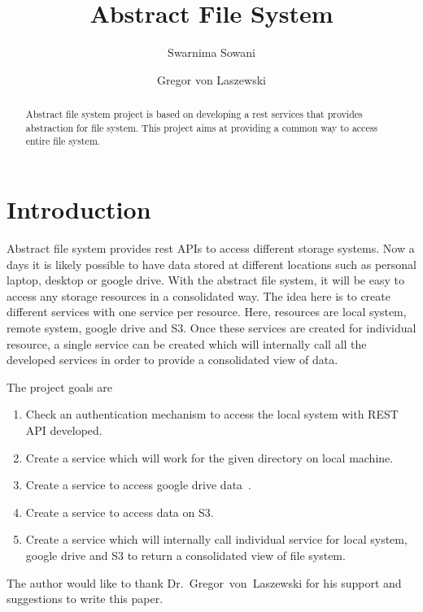 
\title{Abstract File System}


\author{Swarnima Sowani}

\author{Gregor von Laszewski}


\renewcommand{\shortauthors}{G. v. Laszewski}


\begin{abstract}
Abstract file system project is based on developing a rest services that
provides abstraction for file system.
This project aims at providing a common way to access entire file system. 


\end{abstract}



\maketitle

\section{Introduction}

Abstract file system provides rest APIs to access different storage systems. Now
a days it is likely possible to have data stored at different locations such as
personal laptop, desktop or google drive. With the abstract file system, it will
be easy to access any storage resources in a consolidated way. The idea here is
to create different services with one service per resource. Here, resources are
local system, remote system, google drive and S3. Once these services are created
for individual resource, a single service can be created which will internally call all
the developed services in order to provide a consolidated view of data.

The project goals are
\begin{enumerate}
\item	Check an authentication mechanism to access the local system with REST API developed.
\item	Create a service which will work for the given directory on local machine.
\item	Create a service to access google drive data~\cite{hid-sp18-420-amazon-S3-FAQ}.
\item	Create a service to access data on S3.
\item	Create a service which will internally call individual service for local system, 
google drive and S3 to return a consolidated view of file system. 
\end{enumerate}



\begin{acks}

  The author would like to thank Dr.~Gregor~von~Laszewski for his
  support and suggestions to write this paper.

\end{acks}


 

